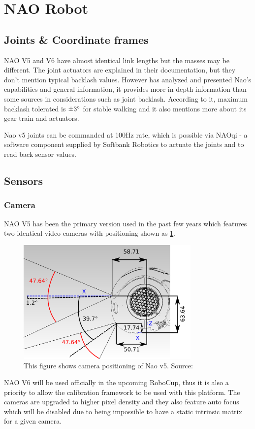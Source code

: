 \documentclass[english, printversion, nomenclature, notitle]{tuvisionthesis} %
\begin{document}
\section{NAO Robot}


\subsection{Joints \& Coordinate frames}

NAO V5 and V6 have almost identical link lengths but the masses may be different. The joint actuators are explained in their documentation, but they don't mention typical backlash values. However \cite{gouaillier_nao_2008} has analyzed and presented Nao's capabilities and general information, it provides more in depth information than some sources in considerations such as joint backlash. According to it, maximum backlash tolerated is $\pm 3\degree$ for stable walking and it also mentions more about its gear train and actuators.

Nao v5 joints can be commanded at 100Hz rate, which is possible via NAOqi - a software component supplied by Softbank Robotics to actuate the joints and to read back sensor values.

\subsection{Sensors}
\subsubsection{Camera}
NAO V5 has been the primary version used in the past few years which features two identical video cameras with positioning shown as \cref{fig:naov5_cameras}.

\begin{figure}
	\begin{center}
		\includegraphics[width=0.8\textwidth]{nao_hardware_camera_lateral.png}
		\caption[Nao v5 camera positioning]{This figure shows camera positioning of Nao v5. Source: \cite{softbank_robotics_video_nodate}}
		\label{fig:naov5_cameras}
	\end{center}
\end{figure}
NAO V6 will be used officially in the upcoming RoboCup, thus it is also a priority to allow the calibration framework to be used with this platform. The cameras are upgraded to higher pixel density and they also feature auto focus which will be disabled due to being impossible to have a static intrinsic matrix for a given camera.
\end{document}
